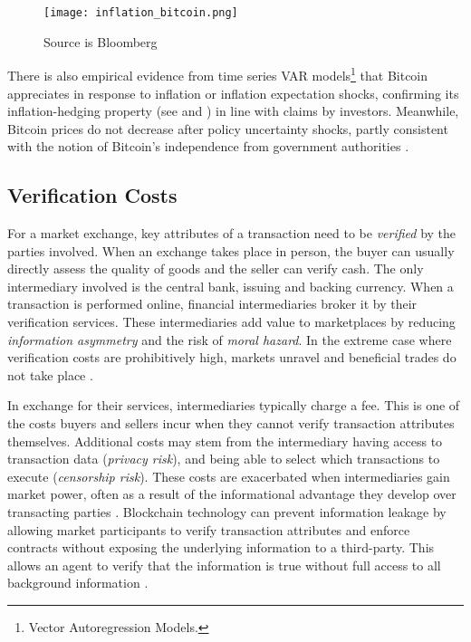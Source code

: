\documentclass[12pt]{article}
\newcommand{\1}{\mathbbm 1}
\begin{document}
	
		
			\begin{figure}[H]
			\begin{Center}
				\texttt{[image: inflation\_bitcoin.png]}
				\caption{Source is Bloomberg}
			\end{Center}
		\end{figure}
		
		
		There is also empirical evidence from time series VAR models\footnote{Vector Autoregression Models.} that Bitcoin appreciates in response to inflation or inflation expectation shocks, confirming its inflation-hedging property (see \cite{choi2022bitcoin} and \cite{blau2021inflation}) in line with claims by investors. Meanwhile, Bitcoin prices do not decrease after policy uncertainty shocks, partly consistent with the notion of Bitcoin's independence from government authorities \cite{choi2022bitcoin}.
		
		
	
		
		\subsection{Verification Costs}
		
		For a market exchange, key attributes of a transaction need to be \textit{verified} by the parties involved. When an exchange takes place in person, the buyer can usually directly assess the quality of goods and the seller can verify cash. The only intermediary involved is the central bank, issuing and backing currency. When a transaction is performed online, financial intermediaries broker it by their verification services. These intermediaries add value to marketplaces by reducing \textit{information asymmetry} and the risk of \textit{moral hazard}. In the extreme case where verification costs are prohibitively high, markets unravel and beneficial trades do not take place \cite{catalini2020some}.
		
		In exchange for their services, intermediaries typically charge a fee. This is one of the costs buyers and sellers incur when they cannot verify transaction attributes themselves. Additional costs may stem from the intermediary having access to transaction data (\textit{privacy risk}), and being able to select which transactions to execute (\textit{censorship risk}). These costs are exacerbated when intermediaries gain market power, often as a result of the informational advantage they develop over transacting parties \cite{stiglitz2002information}. Blockchain technology can prevent information leakage by allowing market participants to verify transaction attributes and enforce contracts without exposing the underlying information to a third-party. This allows an agent to verify that the information is true without full access to all background information \cite{catalini2020some}.
		
\end{document}
